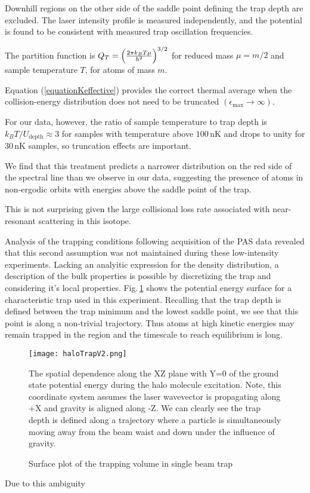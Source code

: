 Downhill regions on the other side of the saddle point defining the trap depth are excluded. The laser intensity profile is measured independently, and the potential is found to be consistent with measured trap oscillation frequencies.

The partition function is $Q_{T}=\left({2\pi k_{B}T \mu \over h^2}\right) ^{3/2}$ for reduced mass $\mu=m/2$ and sample temperature $T$, for atoms of mass $m$.

Equation (\ref{equationKeffective}) provides the correct thermal average when the collision-energy distribution does not need to be truncated $(\epsilon_{\text{max}}\rightarrow \infty)$.

For our data, however, the ratio of sample temperature to trap depth is $k_BT/U_{\text{depth}}\approx 3$ for samples with temperature above $100$\,nK and drops to unity for 30\,nK samples, so truncation effects are important.

We find that this treatment predicts a narrower distribution on the red side of the spectral line than we observe in our data, suggesting the presence of atoms in non-ergodic orbits with energies above the saddle point of the trap.

This is not surprising given the large collisional loss rate associated with near-resonant scattering in this isotope.




Analysis of the trapping conditions following acquisition of the PAS data revealed that this second assumption was not maintained during these low-intensity experiments.
Lacking an analyitic expression for the density distribution, a description of the bulk properties is possible by discretizing the trap and considering it's local properties.
Fig.\,\ref{fig:haloTrapModel} shows the potential energy surface for a characteristic trap used in this experiment.
Recalling that the trap depth is defined between the trap minimum and the lowest saddle point, we see that this point is along a non-trivial trajectory.
Thus atoms at high kinetic energies may remain trapped in the region and the timescale to reach equilibrium is long.
	\begin{figure} 
	\centerline{
	  \texttt{[image: haloTrapV2.png]}}
	  \caption{Surface plot of the trapping volume in single beam trap}{The spatial dependence along the XZ plane with Y=0 of the ground state potential energy during the halo molecule excitation. Note, this coordinate system assumes the laser wavevector is propagating along +X and gravity is aligned along -Z. We can clearly see the trap depth is defined along a trajectory where a particle is simultaneously moving away from the beam waist and down under the influence of gravity.}
	  \label{fig:haloTrapModel}
	\end{figure}
Due to this ambiguity

